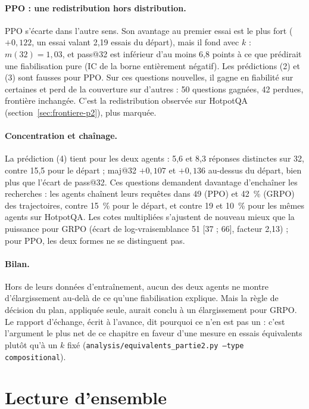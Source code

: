 \paragraph{PPO : une redistribution hors distribution.} PPO s'écarte dans l'autre sens. Son avantage au premier essai est le plus fort ($+0{,}122$, un essai valant 2,19 essais du départ), mais il fond avec $k$ : $m(32) = 1{,}03$, et pass@32 est inférieur d'au moins 6,8 points à ce que prédirait une fiabilisation pure (IC de la borne entièrement négatif). Les prédictions (2) et (3) sont fausses pour PPO. Sur ces questions nouvelles, il gagne en fiabilité sur certaines et perd de la couverture sur d'autres : 50 questions gagnées, 42 perdues, frontière inchangée. C'est la redistribution observée sur HotpotQA (section~\ref{sec:frontiere-p2}), plus marquée.

\paragraph{Concentration et chaînage.} La prédiction (4) tient pour les deux agents : 5,6 et 8,3 réponses distinctes sur 32, contre 15,5 pour le départ ; maj@32 $+0{,}107$ et $+0{,}136$ au-dessus du départ, bien plus que l'écart de pass@32. Ces questions demandent davantage d'enchaîner les recherches : les agents chaînent leurs requêtes dans 49 (PPO) et 42~\% (GRPO) des trajectoires, contre 15~\% pour le départ, et contre 19 et 10~\% pour les mêmes agents sur HotpotQA. Les cotes multipliées s'ajustent de nouveau mieux que la puissance pour GRPO (écart de log-vraisemblance 51 [37 ; 66], facteur 2,13) ; pour PPO, les deux formes ne se distinguent pas.

\paragraph{Bilan.} Hors de leurs données d'entraînement, aucun des deux agents ne montre d'élargissement au-delà de ce qu'une fiabilisation explique. Mais la règle de décision du plan, appliquée seule, aurait conclu à un élargissement pour GRPO. Le rapport d'échange, écrit à l'avance, dit pourquoi ce n'en est pas un : c'est l'argument le plus net de ce chapitre en faveur d'une mesure en essais équivalents plutôt qu'à un $k$ fixé (\texttt{analysis/equivalents\_partie2.py --type compositional}).

\section{Lecture d'ensemble}\label{sec:ensemble-p2}

